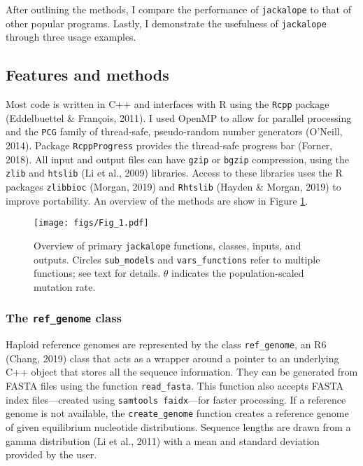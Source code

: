 \documentclass[12pt,]{article}
\begin{document}
After outlining the methods, I compare the performance of \texttt{jackalope} to that of
other popular programs.
Lastly, I demonstrate the usefulness of \texttt{jackalope} through three usage examples.

\hypertarget{features-and-methods}{%
\subsection{Features and methods}\label{features-and-methods}}

Most code is written in C++ and interfaces with R using the \texttt{Rcpp} package
(Eddelbuettel \& François, 2011).
I used OpenMP to allow for parallel processing and
the \texttt{PCG} family of thread-safe, pseudo-random number generators
(O'Neill, 2014).
Package \texttt{RcppProgress} provides the thread-safe progress bar
(Forner, 2018).
All input and output files can have \texttt{gzip} or \texttt{bgzip} compression, using the
\texttt{zlib} and
\texttt{htslib} (Li et al., 2009) libraries.
Access to these libraries uses the R packages
\texttt{zlibbioc} (Morgan, 2019) and
\texttt{Rhtslib} (Hayden \& Morgan, 2019)
to improve portability.
An overview of the methods are show in Figure \ref{fig:jackalope-overview-figure}.

\begin{figure}
\centering
\texttt{[image: figs/Fig\_1.pdf]}
\caption{\label{fig:jackalope-overview-figure}Overview of primary \texttt{jackalope} functions, classes, inputs, and outputs. Circles \texttt{sub\_models} and \texttt{vars\_functions} refer to multiple functions; see text for details. \(\theta\) indicates the population-scaled mutation rate.}
\end{figure}

\hypertarget{the-ref_genome-class}{%
\subsubsection{\texorpdfstring{The \texttt{ref\_genome} class}{The ref\_genome class}}\label{the-ref_genome-class}}

Haploid reference genomes are represented by the class \texttt{ref\_genome}, an
R6 (Chang, 2019) class that acts as a wrapper around a pointer to
an underlying C++ object that stores all the sequence information.
They can be generated from FASTA files using the function \texttt{read\_fasta}.
This function also accepts FASTA index files---created using
\texttt{samtools\ faidx}---for faster processing.
If a reference genome is not available, the \texttt{create\_genome} function creates
a reference genome of given equilibrium nucleotide distributions.
Sequence lengths are drawn from a gamma distribution (Li et al., 2011)
with a mean and standard deviation provided by the user.
\end{document}
